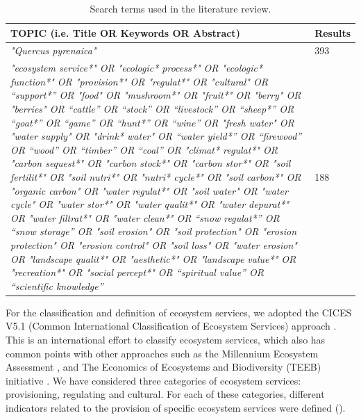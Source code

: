 \begin{table}[]
\caption{Search terms used in the literature review.}
\label{tab:es:wos}
\footnotesize
\begin{tabular}{>{\centering}p{11cm}l}
\toprule
\textbf{TOPIC (i.e. Title OR Keywords OR Abstract)} & \textbf{Results} \\ 
\toprule
\emph{"Quercus pyrenaica"} & 393 \\ \midrule
\emph{"ecosystem service*" OR "ecologic* process*" OR "ecologic*
function*" OR "provision*" OR "regulat*" OR "cultural" OR ``support*'' OR
"food" OR "mushroom*" OR "fruit*" OR "berry" OR "berries" OR
``cattle'' OR ``stock'' OR ``livestock'' OR ``sheep*'' OR ``goat*'' OR
``game'' OR ``hunt*'' OR ``wine'' OR "fresh water" OR "water supply" OR "drink* water" OR ``water
yield*'' OR ``firewood'' OR ``wood'' OR ``timber'' OR ``coal'' OR "climat* regulat*" OR "carbon sequest*" OR "carbon stock*" OR "carbon stor*" OR "soil fertilit*" OR "soil nutri*" OR "nutri* cycle*" OR "soil
carbon*" OR "organic carbon" OR "water regulat*" OR "soil water" OR "water cycle" OR "water stor*"
OR "water qualit*" OR "water depurat*" OR "water filtrat*" OR "water
clean*" OR ``snow regulat*'' OR ``snow storage'' OR "soil erosion" OR "soil protection" OR "erosion protection" OR
"erosion control" OR "soil loss" OR "water erosion" OR "landscape qualit*" OR "aesthetic*" OR "landscape value*" OR
"recreation*" OR "social percept*" OR ``spiritual value'' OR
``scientific knowledge''} & 188 \\
\bottomrule
\end{tabular}
\end{table}

For the classification and definition of ecosystem services, we adopted the CICES V5.1 (Common International Classification of Ecosystem Services) approach \autocites{HainesYoungPotschin2018CommonInternational}. This is an international effort to classify ecosystem services, which also has common points with other approaches such as the Millennium Ecosystem Assessment \autocite{MEA2005EcosystemsHuman}, and The Economics of Ecosystems and Biodiversity (TEEB) initiative \autocite{TEEB2010EconomicsEcosystems}. We have considered three categories of ecosystem services: provisioning, regulating and cultural. For each of these categories, different indicators related to the provision of specific ecosystem services were defined (). 

